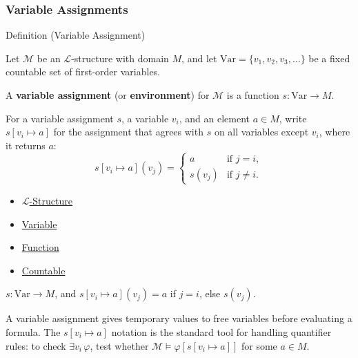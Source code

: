 
\subsubsection*{Variable Assignments}

\begin{definitionbox}{Definition (Variable Assignment)}
\begin{definition}\label{def:variable-assignment}
Let $\mathcal{M}$ be an $\mathcal{L}$-structure with domain $M$, and let
$\mathrm{Var} = \{v_1, v_2, v_3, \ldots\}$ be a fixed countable set of
first-order variables.

A \textbf{variable assignment} (or \textbf{environment}) for $\mathcal{M}$
is a function $s : \mathrm{Var} \to M$.

For a variable assignment $s$, a variable $v_i$, and an element $a \in M$,
write $s[v_i \mapsto a]$ for the assignment that agrees with $s$ on all
variables except $v_i$, where it returns $a$:
\[
  s[v_i \mapsto a](v_j) =
  \begin{cases}
    a      & \text{if } j = i, \\
    s(v_j) & \text{if } j \neq i.
  \end{cases}
\]
\end{definition}
\end{definitionbox}

\begin{dependencies}
\begin{itemize}
  \item \hyperref[def:l-structure]{$\mathcal{L}$-Structure}
  \item \hyperref[def:variable]{Variable}
  \item \hyperref[def:function]{Function}
  \item \hyperref[def:countable]{Countable}
\end{itemize}
\end{dependencies}

\begin{remark*}
$s : \mathrm{Var} \to M$, and
$s[v_i \mapsto a](v_j) = a$ if $j = i$, else $s(v_j)$.
\end{remark*}

\begin{remark*}[Intuition]
A variable assignment gives temporary values to free variables before
evaluating a formula. The $s[v_i \mapsto a]$ notation is the standard
tool for handling quantifier rules: to check $\exists v_i\,\varphi$,
test whether $\mathcal{M} \models \varphi[s[v_i \mapsto a]]$ for some
$a \in M$.
\end{remark*}

